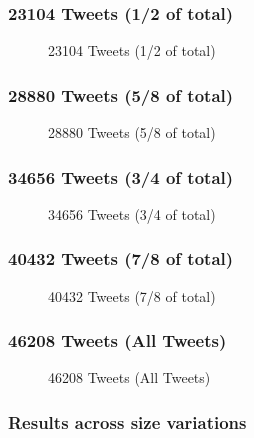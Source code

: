 \documentclass{article}
\begin{document}
\subsubsection{23104 Tweets (1/2 of total)}

\begin{figure}[H]
	\caption{23104 Tweets (1/2 of total)}
\end{figure}

\subsubsection{28880 Tweets (5/8 of total)}

\begin{figure}[H]
	\caption{28880 Tweets (5/8 of total)}
\end{figure}

\subsubsection{34656 Tweets (3/4 of total)}

\begin{figure}[H]
	\caption{34656 Tweets (3/4 of total)}
\end{figure}

\subsubsection{40432 Tweets (7/8 of total)}

\begin{figure}[H]
	\caption{40432 Tweets (7/8 of total)}
\end{figure}

\subsubsection{46208 Tweets (All Tweets)}

\begin{figure}[H]
	\caption{46208 Tweets (All Tweets)}
\end{figure}

\subsubsection{Results across size variations}
\end{document}
